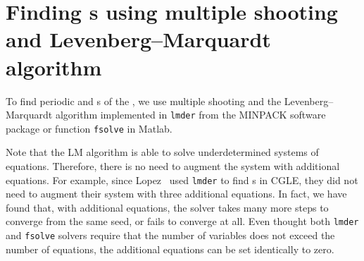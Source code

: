 
\section{Finding \rpo s using multiple shooting and
         Levenberg--Marquardt algorithm}
\label{sec:lmderRLD}

To find periodic and \rpo s of the \KSe , we use multiple shooting and
the Levenberg--Marquardt algorithm implemented in {\tt lmder} from
the MINPACK software package or function {\tt fsolve} in Matlab.

Note that the LM algorithm is able to solve underdetermined systems of
equations.  Therefore, there is no need to augment the system with
additional equations.  For example, since Lopez \etal\ used 
{\tt lmder} to find \rpo s in CGLE, they did not need to augment 
their system with three additional equations.  In fact, we have found
that, with additional equations, the solver takes many more steps to
converge from the same seed, or fails to converge at all.
Even thought both {\tt lmder} and {\tt fsolve} solvers 
require that the number of variables does not exceed the number 
of equations, the additional equations can be set identically to 
zero. 

